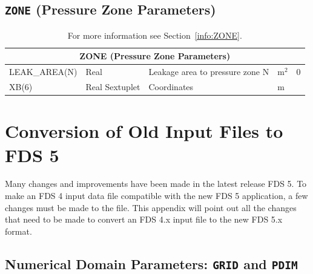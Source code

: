 \documentclass[11pt]{book}
\begin{document}

\vspace{\baselineskip}

\vfill

\section{\texorpdfstring{{\tt ZONE}}{ZONE} (Pressure Zone Parameters)}

\hspace{1in}

\begin{table}[H]
\caption{For more information see Section~\ref{info:ZONE}.}\label{tbl:ZONE}
\noindent
\begin{tabular*}{\textwidth}{@{\extracolsep{\fill}}|l|l|l|l|l|}
\hline
\multicolumn{5}{|c|}{{\ct ZONE} (Pressure Zone Parameters)} \\ \hline \hline
{\ct LEAK\_AREA(N)}         & Real              & Leakage area to pressure zone {\ct N}             & m$^2$                 & 0             \\ \hline
{\ct XB(6)}                 & Real Sextuplet    & Coordinates                                       & m                     &               \\ \hline
\end{tabular*}
\end{table}

\vfill





\chapter{Conversion of Old Input Files to FDS 5}

Many changes and improvements have been made in the latest release FDS 5.
To make an FDS 4 input data file compatible with the new FDS 5 application,
a few changes must be made to the file.
This appendix will point out all the changes that need to be made to convert
an FDS 4.x input file to the new FDS 5.x format.

\section{Numerical Domain Parameters: \texorpdfstring{{\tt GRID}}{GRID} and \texorpdfstring{{\tt PDIM}}{PDIM} }
\end{document}
